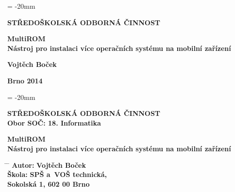 \documentclass[12pt, a4paper, oneside]{article}
\newcommand{\B}{\textbf} %
\begin{document}

\pagestyle{empty} %
 
\voffset = -20mm %
\enlargethispage{60mm} %

\begin{center}
 
\Large \B{STŘEDOŠKOLSKÁ ODBORNÁ ČINNOST}

\vspace{60mm}

\Huge %
\B{MultiROM} \\
\LARGE
\B{Nástroj pro instalaci více operačních systému na mobilní zařízení}

\Large

\vspace{90mm}


\B{Vojtěch Boček} \\

\vspace{40mm}

\B{Brno 2014}


\end{center}

\newpage %

\voffset = -20mm %
\enlargethispage{60mm} %

\begin{center}

\Large \B{STŘEDOŠKOLSKÁ ODBORNÁ ČINNOST}  \\
\vspace{10mm}
 \normalsize 
\B{Obor SOČ: 18. Informatika}%

\vspace{45mm}

\Huge
\B{MultiROM} \\
\LARGE
\B{Nástroj pro instalaci více operačních systému na mobilní zařízení}
\end{center}
\large

\vspace{50mm}


\begin{tabbing}
\hspace{10mm} \= \hspace{30mm}  \=   \kill %
  \> \B{Autor:}  \> \B{Vojtěch Boček}        \\[8mm] 
  \> \B{Škola:}   \> \B{SPŠ a~VOŠ technická, }     \\
  \>              \> \B{Sokolská 1, 602 00 Brno}    \\[8mm]
\end{tabbing}
\end{document}
